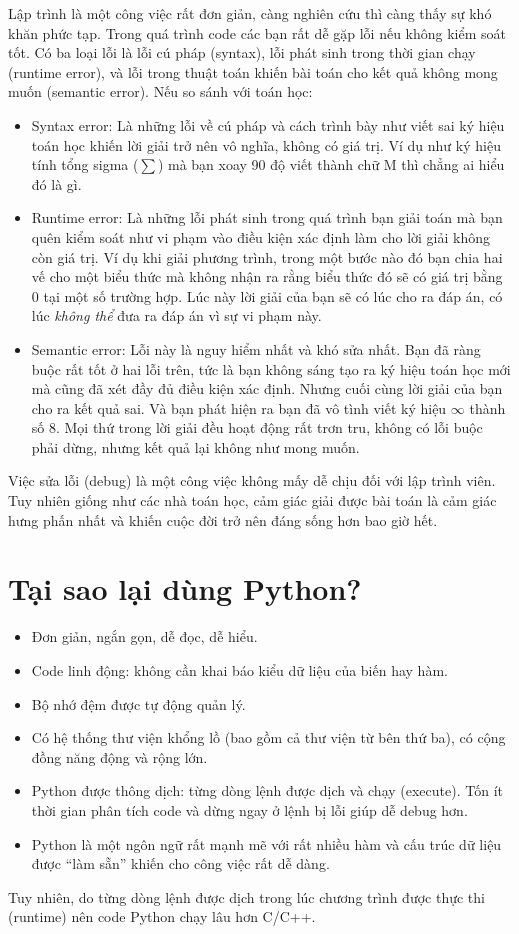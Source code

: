 \documentclass[12pt, a4paper, twoside]{article}
\begin{document}
Lập trình là một công việc rất đơn giản, càng nghiên cứu thì càng thấy sự khó khăn phức tạp. Trong quá trình code các bạn rất dễ gặp lỗi nếu không kiểm soát tốt. Có ba loại lỗi là lỗi cú pháp (syntax), lỗi phát sinh trong thời gian chạy (runtime error), và lỗi trong thuật toán khiến bài toán cho kết quả không mong muốn (semantic error). Nếu so sánh với toán học:
\begin{itemize}
    \item Syntax error: Là những lỗi về cú pháp và cách trình bày như viết sai ký hiệu toán học khiến lời giải trở nên vô nghĩa, không có giá trị. Ví dụ như ký hiệu tính tổng sigma ($\sum$) mà bạn xoay 90 độ viết thành chữ M thì chẳng ai hiểu đó là gì.
    \item Runtime error: Là những lỗi phát sinh trong quá trình bạn giải toán mà bạn quên kiểm soát như vi phạm vào điều kiện xác định làm cho lời giải không còn giá trị. Ví dụ khi giải phương trình, trong một bước nào đó bạn chia hai vế cho một biểu thức mà không nhận ra rằng biểu thức đó sẽ có giá trị bằng 0 tại một số trường hợp. Lúc này lời giải của bạn sẽ có lúc cho ra đáp án, có lúc \textit{không thể} đưa ra đáp án vì sự vi phạm này.
    \item Semantic error: Lỗi này là nguy hiểm nhất và khó sửa nhất. Bạn đã ràng buộc rất tốt ở hai lỗi trên, tức là bạn không sáng tạo ra ký hiệu toán học mới mà cũng đã xét đầy đủ điều kiện xác định. Nhưng cuối cùng lời giải của bạn cho ra kết quả sai. Và bạn phát hiện ra bạn đã vô tình viết ký hiệu $\infty$ thành số 8. Mọi thứ trong lời giải đều hoạt động rất trơn tru, không có lỗi buộc phải dừng, nhưng kết quả lại không như mong muốn.
\end{itemize}

Việc sửa lỗi (debug) là một công việc không mấy dễ chịu đối với lập trình viên. Tuy nhiên giống như các nhà toán học, cảm giác giải được bài toán là cảm giác hưng phấn nhất và khiến cuộc đời trở nên đáng sống hơn bao giờ hết.

\section{Tại sao lại dùng Python?}
\begin{itemize}
    \item Đơn giản, ngắn gọn, dễ đọc, dễ hiểu.
    \item Code linh động: không cần khai báo kiểu dữ liệu của biến hay hàm.
    \item Bộ nhớ đệm được tự động quản lý.
    \item Có hệ thống thư viện khổng lồ (bao gồm cả thư viện từ bên thứ ba), có cộng đồng năng động và rộng lớn.
    \item Python được thông dịch: từng dòng lệnh được dịch và chạy (execute). Tốn ít thời gian phân tích code và dừng ngay ở lệnh bị lỗi giúp dễ debug hơn.
    \item Python là một ngôn ngữ rất mạnh mẽ với rất nhiều hàm và cấu trúc dữ liệu được ``làm sẵn'' khiến cho công việc rất dễ dàng.
\end{itemize}
Tuy nhiên, do từng dòng lệnh được dịch trong lúc chương trình được thực thi (runtime) nên code Python chạy lâu hơn C/C++.
\end{document}
